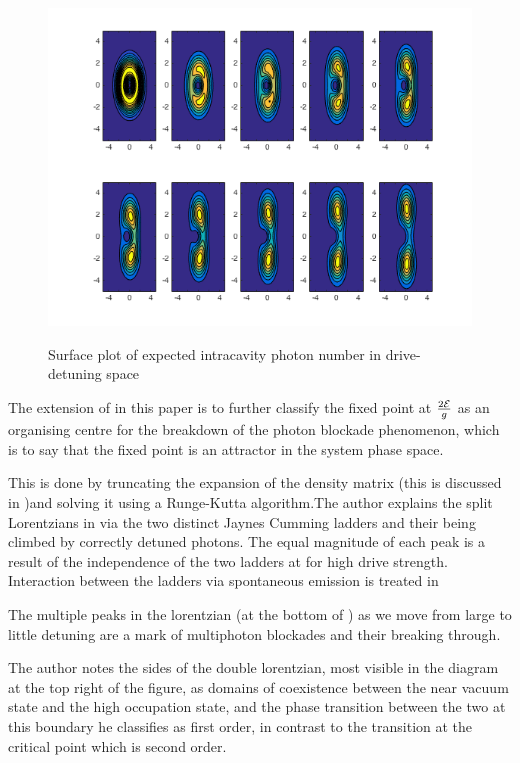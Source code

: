 \begin{figure}[h]
\begin{minipage}{.3\linewidth}
		\includegraphics[width=1\textwidth]{Images/Q-Bifurcation.png}
		\label{fig:Qbirfc}
	\end{minipage}
	\caption{Surface plot of expected intracavity photon number in drive-detuning space}
\end{figure}

The extension of \autocite{Alsing1999} in this paper is to further classify the fixed point at $\frac{2\mathcal{E}}{g}$ as an organising centre for the breakdown of the photon blockade phenomenon, which is to say that the fixed point is an attractor in the system phase space.

This is done by truncating the expansion of the density matrix (this is discussed in \autocite{Savage1988})and solving it using a Runge-Kutta algorithm.The author explains the split Lorentzians in \autocite[Figure 1]{Carmichael2015} via the two distinct Jaynes Cumming ladders and their being climbed by correctly detuned photons. The equal magnitude of each peak is a result of the independence of the two ladders at for high drive strength. Interaction between the ladders via spontaneous emission is treated in \autocite[Section V]{Carmichael2015}

The multiple peaks in the lorentzian (at the bottom of \autocite[Figure 1]{Carmichael2015}) as we move from large to little detuning are a mark of multiphoton blockades and their breaking through.

The author notes the sides of the double lorentzian, most visible in the diagram at the top right of the figure, as domains of coexistence between the near vacuum state and the high occupation state, and the phase transition between the two at this boundary he classifies as first order, in contrast to the transition at the critical point which is second order.

